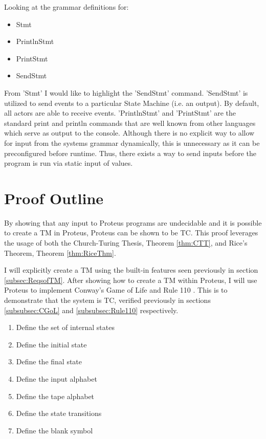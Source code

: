 Looking at the grammar definitions for:
\begin{itemize}
    \item Stmt
    \item PrintlnStmt
    \item PrintStmt
    \item SendStmt
\end{itemize}

From 'Stmt' I would like to highlight the 'SendStmt' command.
'SendStmt' is utilized to send events to a particular State Machine (i.e. an output).
By default, all actors are able to receive events.
'PrintlnStmt' and 'PrintStmt' are the standard print and println commands that are well known from other languages which serve as output to the console.
Although there is no explicit way to allow for input from the systems grammar dynamically, this is unnecessary as it can be preconfigured before runtime.
Thus, there exists a way to send inputs before the program is run via static input of values.

\section{Proof Outline}\label{sec:ProofOutline}

By showing that any input to Proteus programs are undecidable and it is possible to create a TM in Proteus, Proteus can be shown to be TC.
This proof leverages the usage of both the Church-Turing Thesis, Theorem \ref{thm:CTT}, and Rice's Theorem, Theorem \ref{thm:RiceThm}.

I will explicitly create a TM using the built-in features seen previously in section \ref{subsec:ReqsofTM}.
After showing how to create a TM within Proteus, I will use Proteus to implement Conway's Game of Life and Rule 110 .
This is to demonstrate that the system is TC, verified previously in sections \ref{subsubsec:CGoL} and \ref{subsubsec:Rule110} respectively.

\begin{enumerate}
    \item Define the set of internal states
    \item Define the initial state
    \item Define the final state
    \item Define the input alphabet
    \item Define the tape alphabet
    \item Define the state transitions
    \item Define the blank symbol
\end{enumerate}

